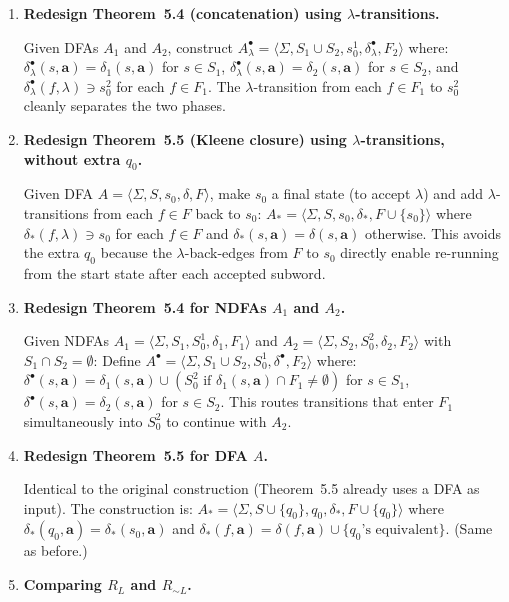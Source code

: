 \begin{enumerate}[{5.}1. ]
\item \textbf{Redesign Theorem~5.4 (concatenation) using $\lambda$-transitions.}

Given DFAs $A_1$ and $A_2$, construct $A^\bullet_\lambda=\langle\Sigma,S_1\cup S_2,s^1_0,\delta^\bullet_\lambda,F_2\rangle$ where:
$\delta^\bullet_\lambda(s,\pmb{a})=\delta_1(s,\pmb{a})$ for $s\in S_1$,
$\delta^\bullet_\lambda(s,\pmb{a})=\delta_2(s,\pmb{a})$ for $s\in S_2$, and
$\delta^\bullet_\lambda(f,\lambda)\ni s^2_0$ for each $f\in F_1$.
The $\lambda$-transition from each $f\in F_1$ to $s^2_0$ cleanly separates the two phases.

\item \textbf{Redesign Theorem~5.5 (Kleene closure) using $\lambda$-transitions, without extra $q_0$.}

Given DFA $A=\langle\Sigma,S,s_0,\delta,F\rangle$, make $s_0$ a final state (to accept $\lambda$) and add $\lambda$-transitions from each $f\in F$ back to $s_0$:
$A_*=\langle\Sigma,S,s_0,\delta_*,F\cup\{s_0\}\rangle$ where $\delta_*(f,\lambda)\ni s_0$ for each $f\in F$ and $\delta_*(s,\pmb{a})=\delta(s,\pmb{a})$ otherwise.
This avoids the extra $q_0$ because the $\lambda$-back-edges from $F$ to $s_0$ directly enable re-running from the start state after each accepted subword.

\item \textbf{Redesign Theorem~5.4 for NDFAs $A_1$ and $A_2$.}

Given NDFAs $A_1=\langle\Sigma,S_1,S^1_0,\delta_1,F_1\rangle$ and $A_2=\langle\Sigma,S_2,S^2_0,\delta_2,F_2\rangle$ with $S_1\cap S_2=\emptyset$:
Define $A^\bullet=\langle\Sigma,S_1\cup S_2,S^1_0,\delta^\bullet,F_2\rangle$ where:
$\delta^\bullet(s,\pmb{a})=\delta_1(s,\pmb{a})\cup(S^2_0\text{ if }\delta_1(s,\pmb{a})\cap F_1\neq\emptyset)$ for $s\in S_1$,
$\delta^\bullet(s,\pmb{a})=\delta_2(s,\pmb{a})$ for $s\in S_2$.
This routes transitions that enter $F_1$ simultaneously into $S^2_0$ to continue with $A_2$.

\item \textbf{Redesign Theorem~5.5 for DFA $A$.}

Identical to the original construction (Theorem~5.5 already uses a DFA as input).  The construction is:
$A_*=\langle\Sigma,S\cup\{q_0\},q_0,\delta_*,F\cup\{q_0\}\rangle$ where $\delta_*(q_0,\pmb{a})=\delta_*(s_0,\pmb{a})$ and $\delta_*(f,\pmb{a})=\delta(f,\pmb{a})\cup\{q_0\text{'s equivalent}\}$.  (Same as before.)

\item \textbf{Comparing $R_L$ and $R_{\sim L}$.}


\end{enumerate}
